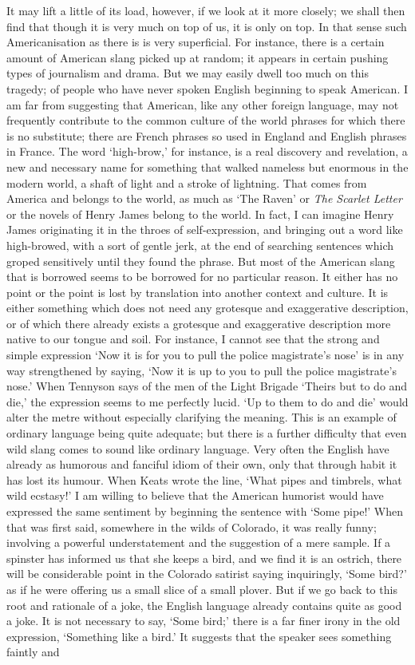 \documentclass{book}
\begin{document}
It may lift a little of its load, however, if we look at it more closely; we shall then find that though it is very much on top of us, it is only on top. In that sense such Americanisation as there is is very superficial. For instance, there is a certain amount of American slang picked up at random; it appears in certain pushing types of journalism and drama. But we may easily dwell too much on this tragedy; of people who have never spoken English beginning to speak American. I am far from suggesting that American, like any other foreign language, may not frequently contribute to the common culture of the world phrases for which there is no substitute; there are French phrases so used in England and English phrases in France. The word ‘high-brow,’ for instance, is a real discovery and revelation, a new and necessary name for something that walked nameless but enormous in the modern world, a shaft of light and a stroke of lightning. That comes from America and belongs to the world, as much as ‘The Raven’ or \emph{The Scarlet Letter} or the novels of Henry James belong to the world. In fact, I can imagine Henry James originating it in the throes of self-expression, and bringing out a word like high-browed, with a sort of gentle jerk, at the end of searching sentences which groped sensitively until they found the phrase. But most of the American slang that is borrowed seems to be borrowed for no particular reason. It either has no point or the point is lost by translation into another context and culture. It is either something which does not need any grotesque and exaggerative description, or of which there already exists a grotesque and exaggerative description more native to our tongue and soil. For instance, I cannot see that the strong and simple expression ‘Now it is for you to pull the police magistrate’s nose’ is in any way strengthened by saying, ‘Now it is up to you to pull the police magistrate’s nose.’ When Tennyson says of the men of the Light Brigade ‘Theirs but to do and die,’ the expression seems to me perfectly lucid. ‘Up to them to do and die’ would alter the metre without especially clarifying the meaning. This is an example of ordinary language being quite adequate; but there is a further difficulty that even wild slang comes to sound like ordinary language. Very often the English have already as humorous and fanciful idiom of their own, only that through habit it has lost its humour. When Keats wrote the line, ‘What pipes and timbrels, what wild ecstasy!’ I am willing to believe that the American humorist would have expressed the same sentiment by beginning the sentence with ‘Some pipe!’ When that was first said, somewhere in the wilds of Colorado, it was really funny; involving a powerful understatement and the suggestion of a mere sample. If a spinster has informed us that she keeps a bird, and we find it is an ostrich, there will be considerable point in the Colorado satirist saying inquiringly, ‘Some bird?’ as if he were offering us a small slice of a small plover. But if we go back to this root and rationale of a joke, the English language already contains quite as good a joke. It is not necessary to say, ‘Some bird;’ there is a far finer irony in the old expression, ‘Something like a bird.’ It suggests that the speaker sees something faintly and 
\end{document}
